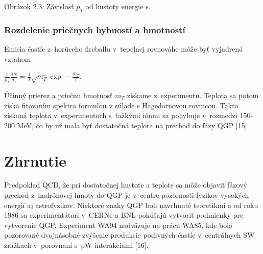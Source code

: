 \vspace*{6cm}
\hspace*{-2.3cm}

\vspace*{-8cm}
\begin{center}
  Obrázok 2.3: Závislosť $p_{T}$ od hustoty energie $\epsilon$.
\end{center}

\subsubsection{Rozdelenie priečnych hybností a hmotností}
Emisia častíc z~horúceho fireballu v~tepelnej rovnováhe
môže byť vyjadrená  vzťahom
\begin{center}
 $\frac{1}{p_{T}}\frac{dN}{p_{T}} =
 \frac{1}{T}\sqrt{m_{T}}\exp-\frac{m_{T}}{T}$.
\end{center}
Účinný prierez a priečnu hmotnosť $m_{T}$ získame
z~experimentu. Teplota sa potom získa fitovaním spektra formulou v
súlade s Hagedornovou rovnicou. Takto získaná teplota v~experimentoch
s~ťažkými iónmi sa pohybuje v~rozmedzi 150-200 MeV, čo by
už mala byť dostatočná teplota na prechod do fázy QGP [15].

\section{Zhrnutie}
Predpoklad QCD, že pri dostatočnej hustote a teplote sa môže
objaviť fázový prechod z~hadrónovej hmoty do QGP je v~centre
pozornosti fyzikov vysokých energií aj astrofyzikov. Niektoré znaky QGP boli
navrhnuté teoretikmi a od roku 1986 sa experimentátori v~CERNe a BNL
pokúšajú vytvoriť  podmienky pre vytvorenie QGP. Experiment
WA94 nadväzuje na prácu WA85, kde bolo pozorované dvojnásobné
zvýšenie produkcie podivných častíc v~centrálnych SW
zrážkach  v~porovnaní s~pW interakciami [16].

